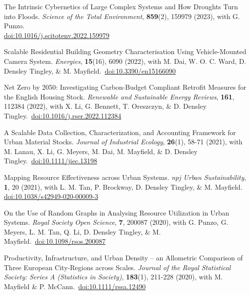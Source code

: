 \documentclass[10pt]{article}
\begin{document}
\begin{etaremune}[leftmargin=0ex, topsep=0ex]
	\item The Intrinsic Cybernetics of Large Complex Systems and How Droughts Turn into Floods. \emph{Science of the Total Environment}, \textbf{859}(2), 159979 (2023), with G. Punzo.~\\\href{https://doi.org/10.1016/j.scitotenv.2022.159979}{doi:10.1016/j.scitotenv.2022.159979}
	
	\item Scalable Residential Building Geometry Characterisation Using Vehicle-Mounted Camera System. \emph{Energies}, \textbf{15}(16), 6090 (2022), with M. Dai, W. O. C. Ward, D. Densley Tingley, \& M. Mayfield.~\href{https://doi.org/10.3390/en15166090}{doi:10.3390/en15166090}

	\item Net Zero by 2050: Investigating Carbon-Budget Compliant Retrofit Measures for the English Housing Stock. \emph{Renewable and Sustainable Energy Reviews}, \textbf{161}, 112384 (2022), with X. Li, G. Bennett, T. Oreszczyn, \& D. Densley Tingley.~\href{https://doi.org/10.1016/j.rser.2022.112384}{doi:10.1016/j.rser.2022.112384}

	\item A Scalable Data Collection, Characterization, and Accounting Framework for Urban Material Stocks. \emph{Journal of Industrial Ecology}, \textbf{26}(1), 58-71 (2021), with M. Lanau, X. Li, G. Meyers, M. Dai, M. Mayfield, \& D. Densley Tingley.~\href{http://dx.doi.org/10.1111/jiec.13198}{doi:10.1111/jiec.13198}
	
	\item Mapping Resource Effectiveness across Urban Systems. \emph{npj Urban Sustainability}, \textbf{1}, 20 (2021), with L. M. Tan, P. Brockway, D. Densley Tingley, \& M. Mayfield.~\\\href{http://dx.doi.org/10.1038/s42949-020-00009-3}{doi:10.1038/s42949-020-00009-3}

	\item On the Use of Random Graphs in Analysing Resource Utilization in Urban Systems. \emph{Royal Society Open Science}, \textbf{7}, 200087 (2020), with G. Punzo, G. Meyers, L. M. Tan, Q. Li, D. Densley Tingley, \& M. Mayfield.~\href{http://dx.doi.org/10.1098/rsos.200087}{doi:10.1098/rsos.200087}
	
	\item Productivity, Infrastructure, and Urban Density -- an Allometric Comparison of Three European City-Regions across Scales. \emph{Journal of the Royal Statistical Society: Series A (Statistics in Society)}, \textbf{183}(1), 211-228 (2020), with M. Mayfield \& P. McCann.~\href{https://doi.org/10.1111/rssa.12490}{doi:10.1111/rssa.12490}
		

\end{etaremune}
\end{document}
